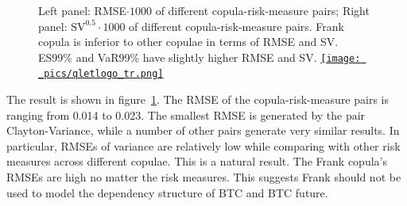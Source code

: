 \begin{figure}%
    \centering
    \qquad
    \caption{Left panel: RMSE$\cdot 1000$ of different copula-risk-measure pairs; Right panel: $\text{SV}^{0.5}\cdot 1000$ of
    different copula-risk-measure pairs. Frank copula is inferior to other copulae in terms of RMSE and SV.
    ES99\% and VaR99\% have slightly higher RMSE and SV.
   \href{http://www.quantlet.com/}{\texttt{[image: \_pics/qletlogo\_tr.png]}}}%
    \label{fig:rmse_sv}%
\end{figure}

The result is shown in figure~\ref{fig:rmse_sv}.
The RMSE of the copula-risk-measure pairs is ranging from 0.014 to 0.023.
The smallest RMSE is generated by the pair Clayton-Variance, while a number of other pairs generate very similar results.
In particular, RMSEs of variance are relatively low while comparing with other risk measures across different copulae.
This is a natural result.
The Frank copula's RMSEs are high no matter the risk measures.
This suggests Frank should not be used to model the dependency structure of BTC and BTC future.\medskip

